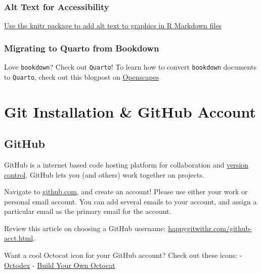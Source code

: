 \documentclass[
]{book}
\begin{document}
\hypertarget{alt-text-for-accessibility}{%
\subsection{Alt Text for Accessibility}\label{alt-text-for-accessibility}}

\href{https://www.rstudio.com/blog/knitr-fig-alt/}{Use the knitr package to add alt text to graphics in R Markdown files}

\hypertarget{migrating-to-quarto-from-bookdown}{%
\subsection{Migrating to Quarto from Bookdown}\label{migrating-to-quarto-from-bookdown}}

Love \texttt{bookdown}? Check out \texttt{Quarto}! To learn how to convert \texttt{bookdown} documents to \texttt{Quarto}, check out this blogpost on \href{https://www.openscapes.org/blog/2022/07/21/quarto-migrate/}{Openscapes}

\hypertarget{git}{%
\chapter{Git Installation \& GitHub Account}\label{git}}

\hypertarget{github}{%
\section{GitHub}\label{github}}

GitHub is a internet based code hosting platform for collaboration and \href{https://www.atlassian.com/git/tutorials/what-is-version-control\#:~:text=Version\%20control\%2C\%20also\%20known\%20as,to\%20source\%20code\%20over\%20time.}{version control}. GitHub lets you (and others) work together on projects.

Navigate to \href{https://github.com/}{github.com}, and create an account! Please use either your work or personal email account. You can add several emails to your account, and assign a particular email as the primary email for the account.

Review this article on choosing a GitHub username: \url{happygitwithr.com/github-acct.html}.

Want a cool Octocat icon for your GitHub account? Check out these icons:
- \href{https://octodex.github.com/}{Octodex}
- \href{https://myoctocat.com/}{Build Your Own Octocat}
\end{document}
